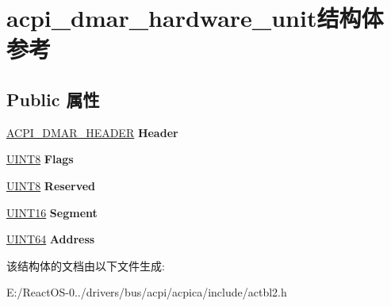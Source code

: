 \hypertarget{structacpi__dmar__hardware__unit}{}\section{acpi\+\_\+dmar\+\_\+hardware\+\_\+unit结构体 参考}
\label{structacpi__dmar__hardware__unit}
\subsection*{Public 属性}
\begin{DoxyCompactItemize}
\item 
\mbox{\label{structacpi__dmar__hardware__unit_a474e1ed871cbfa2972ce6fffd2c499be}} 
\hyperlink{structacpi__dmar__header}{A\+C\+P\+I\+\_\+\+D\+M\+A\+R\+\_\+\+H\+E\+A\+D\+ER} {\bfseries Header}
\item 
\mbox{\label{structacpi__dmar__hardware__unit_a3f845634a858f392f9b5c4c299c64819}} 
\hyperlink{_processor_bind_8h_ab27e9918b538ce9d8ca692479b375b6a}{U\+I\+N\+T8} {\bfseries Flags}
\item 
\mbox{\label{structacpi__dmar__hardware__unit_a670a2dcb208c7ca1974ad7a6c98a30c6}} 
\hyperlink{_processor_bind_8h_ab27e9918b538ce9d8ca692479b375b6a}{U\+I\+N\+T8} {\bfseries Reserved}
\item 
\mbox{\label{structacpi__dmar__hardware__unit_ad8039f2c0f21c65ec4479a07c5b1f869}} 
\hyperlink{_processor_bind_8h_a09f1a1fb2293e33483cc8d44aefb1eb1}{U\+I\+N\+T16} {\bfseries Segment}
\item 
\mbox{\label{structacpi__dmar__hardware__unit_afc989c042e4c3d0c68ebc355b0ecea66}} 
\hyperlink{_processor_bind_8h_a57be03562867144161c1bfee95ca8f7c}{U\+I\+N\+T64} {\bfseries Address}
\end{DoxyCompactItemize}


该结构体的文档由以下文件生成\+:\begin{DoxyCompactItemize}
\item 
E\+:/\+React\+O\+S-\/0../drivers/bus/acpi/acpica/include/actbl2.\+h\end{DoxyCompactItemize}
